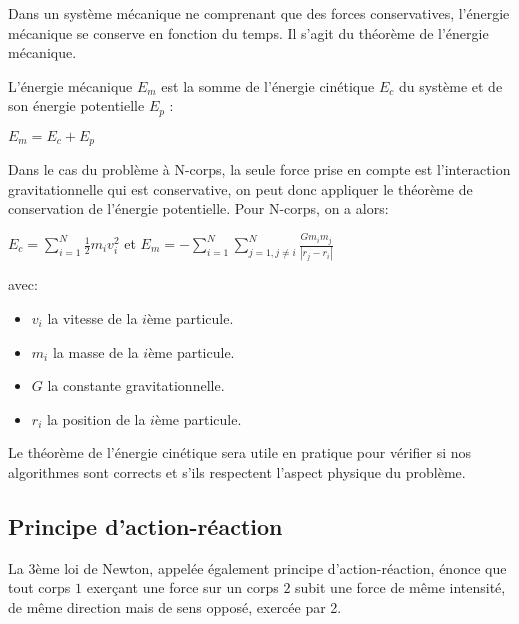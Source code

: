 Dans un système mécanique ne comprenant que des forces conservatives, l'énergie mécanique se conserve en fonction du temps. Il s'agit du théorème de l'énergie mécanique.

L'énergie mécanique $E_m$ est la somme de l'énergie cinétique $E_c$ du système et de son énergie potentielle $E_p$ :

\begin{center}
$E_m = E_c + E_p$
\end{center}

Dans le cas du problème à N-corps, la seule force prise en compte est l'interaction gravitationnelle qui est conservative, on peut donc appliquer le théorème de conservation de l'énergie potentielle. Pour N-corps, on a alors:

\begin{center}
$E_c = \sum\limits_{i=1}^{N} \frac{1}{2}m_i v_i^{2}$  et $E_m =- \sum\limits_{i=1}^{N} \sum\limits_{j=1,j \ne i}^{N} \frac{G m_i m_j}{| r_j - r_i |}$
\end{center}

avec:
\begin{itemize}
\item $v_i$ la vitesse de la $i$ème particule.

\item $m_i$ la masse de la $i$ème particule.

\item $G$ la constante gravitationnelle.

\item $r_i$ la position de la $i$ème particule.

\end{itemize}

\vspace{1mm}
Le théorème de l'énergie cinétique sera utile en pratique pour vérifier si nos algorithmes sont corrects et s'ils respectent l'aspect physique du problème.

\vspace{2mm}
\subsection{Principe d'action-réaction}
\vspace{2mm}

La 3ème loi de Newton, appelée également principe d'action-réaction, énonce que tout corps $1$ exerçant une force sur un corps $2$ subit une force de même intensité, de même direction mais de sens opposé, exercée par 2.

